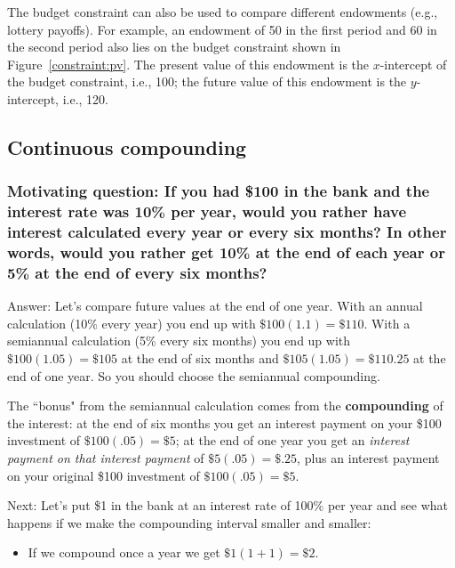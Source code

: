 \begin{CALCULUS}
The budget constraint can also be used to compare different endowments (e.g., lottery payoffs). For example, an endowment of 50 in the first period and 60 in the second period also lies on the budget constraint shown in Figure~\ref{constraint:pv}. The present value of this endowment is the $x$-intercept of the budget constraint, i.e., 100; the future value of this endowment is the $y$-intercept, i.e., 120. 


\subsection*{Continuous compounding}

\subsubsection*{Motivating question: \rm If you had \$100 in the bank and the interest rate was 10\% per year, would you rather have interest calculated every year or every six months? In other words, would you rather get 10\% at the end of each year or 5\% at the end of every six months?}

Answer: Let's compare future values at the end of one year. With an annual calculation (10\% every year) you end up with $\$100(1.1)=\$110.$ With a semiannual calculation (5\% every six months) you end up with $\$100(1.05)=\$105$ at the end of six months and $\$105(1.05)=\$110.25$ at the end of one year. So you should choose the semiannual compounding.

The ``bonus" from the semiannual calculation comes from the \textbf{compounding} of the interest: at the end of six months you get an interest payment on your \$100 investment of $\$100(.05)=\$5$; at the end of one year you get an \emph{interest payment on that interest payment} of $\$5(.05)=\$.25$, plus an interest payment on your original \$100 investment of $\$100(.05)=\$5$.


Next: Let's put \$1 in the bank at an interest rate of 100\% per year and see what happens if we make the compounding interval smaller and smaller:
\begin{itemize}
\item If we compound once a year we get $\$1(1+1)=\$2$.


\end{itemize}
\end{CALCULUS}
